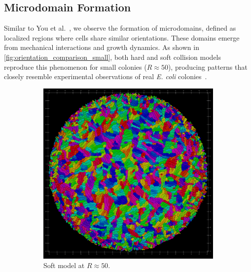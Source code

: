 \documentclass[conference]{IEEEtran}
\begin{document}
\subsection{Microdomain Formation}
\label{sec:microdomain_formation}

Similar to You et al.~\cite{You2018,You_2021}, we observe the formation of microdomains, defined as localized regions where cells share similar orientations. These domains emerge from mechanical interactions and growth dynamics. As shown in \autoref{fig:orientation_comparison_small}, both hard and soft collision models reproduce this phenomenon for small colonies ($R \approx 50$), producing patterns that closely resemble experimental observations of real \textit{E. coli} colonies~\cite{You2018}.

\begin{figure}[H]
    \centering
    \begin{subfigure}[b]{0.49\columnwidth}
        \centering
        \includegraphics[width=\linewidth]{figures/orientation_comparisons/r50_soft_e-2.jpeg}
        \caption{Soft model at $R \approx 50$.}
    \end{subfigure}
    \begin{subfigure}[b]{0.49\columnwidth}
        \centering

\end{subfigure}
\end{figure}
\end{document}
